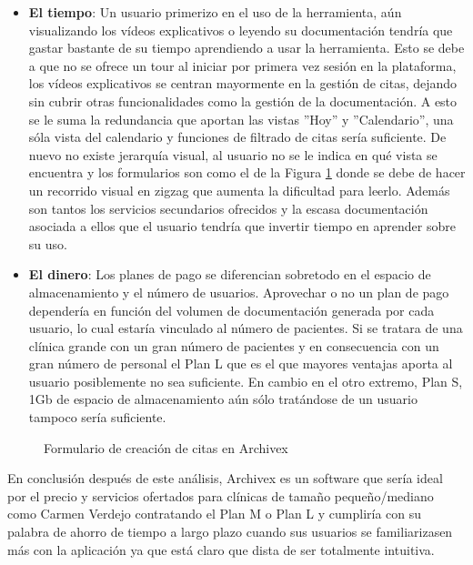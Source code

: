 \begin{itemize}
    \item \textbf{El tiempo}: Un usuario primerizo en el uso de la herramienta, aún visualizando los vídeos explicativos o leyendo su documentación tendría que gastar bastante de su tiempo aprendiendo a usar la herramienta. Esto se debe a que no se ofrece un tour al iniciar por primera vez sesión en la plataforma, los vídeos explicativos se centran mayormente en la gestión de citas, dejando sin cubrir otras funcionalidades como la gestión de la documentación. A esto se le suma la redundancia que aportan las vistas ''Hoy'' y ''Calendario'', una sóla vista del calendario y funciones de filtrado de citas sería suficiente. De nuevo no existe jerarquía visual, al usuario no se le indica en qué vista se encuentra y los formularios son como el de la Figura \ref{fig:archivex-crear-citas} donde se debe de hacer un recorrido visual en zigzag que aumenta la dificultad para leerlo. Además son tantos los servicios secundarios ofrecidos y la escasa documentación asociada a ellos que el usuario tendría que invertir tiempo en aprender sobre su uso. 
    \item \textbf{El dinero}: Los planes de pago se diferencian sobretodo en el espacio de almacenamiento y el número de usuarios. Aprovechar o no un plan de pago dependería en función del volumen de documentación generada por cada usuario, lo cual estaría vinculado al número de pacientes. Si se tratara de una clínica grande con un gran número de pacientes y en consecuencia con un gran número de personal el Plan L que es el que mayores ventajas aporta al usuario posiblemente no sea suficiente. En cambio en el otro extremo, Plan S, 1Gb de espacio de almacenamiento aún sólo tratándose de un usuario tampoco sería suficiente.
\end{itemize}

\begin{figure}[H]
    \caption{Formulario de creación de citas en Archivex}
    \label{fig:archivex-crear-citas}
\end{figure}

En conclusión después de este análisis, Archivex es un software que sería ideal por el precio y servicios ofertados para clínicas de tamaño pequeño/mediano como Carmen Verdejo contratando el Plan M o Plan L y cumpliría con su palabra de ahorro de tiempo a largo plazo cuando sus usuarios se familiarizasen más con la aplicación ya que está claro que dista de ser totalmente intuitiva. \bigskip
